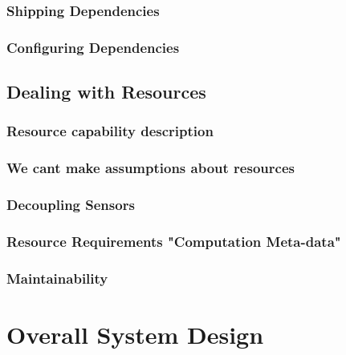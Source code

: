 \subsubsection{Shipping Dependencies}
\subsubsection{Configuring Dependencies}
\subsection{Dealing with Resources}
\subsubsection{Resource capability description}
\subsubsection{We cant make assumptions about resources}
\subsubsection{Decoupling Sensors}
\subsubsection{Resource Requirements "Computation Meta-data"}

\subsubsection{Maintainability}

\section{Overall System Design}

